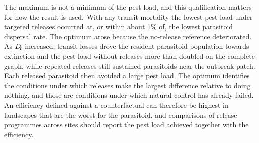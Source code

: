 The maximum is not a minimum of the pest load, and this qualification matters for how the result is used. With any transit mortality the lowest pest load under targeted releases occurred at, or within about 1\% of, the lowest parasitoid dispersal rate. The optimum arose because the no-release reference deteriorated. As $D_{\!t}$ increased, transit losses drove the resident parasitoid population towards extinction and the pest load without releases more than doubled on the complete graph, while repeated releases still sustained parasitoids near the outbreak patch. Each released parasitoid then avoided a large pest load. The optimum identifies the conditions under which releases make the largest difference relative to doing nothing, and those are conditions under which natural control has already failed. An efficiency defined against a counterfactual can therefore be highest in landscapes that are the worst for the parasitoid, and comparisons of release programmes across sites should report the pest load achieved together with the efficiency.

